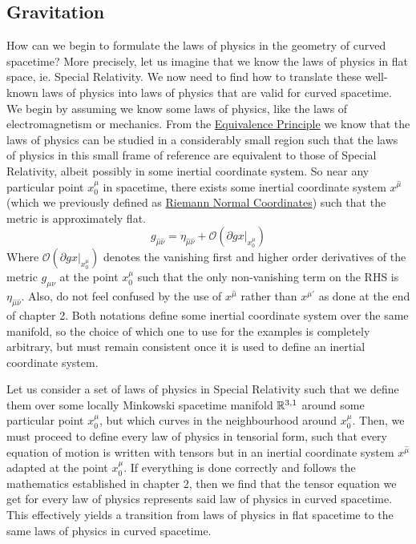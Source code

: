 \documentclass{article}
\begin{document}
 	\subsection{Gravitation}
 		How can we begin to formulate the laws of physics in the geometry of curved spacetime? More precisely, let us imagine that we know the laws of physics in flat space, ie. Special Relativity. We now need to find how to translate these well-known laws of physics into laws of physics that are valid for curved spacetime. We begin by assuming we know some laws of physics, like the laws of electromagnetism or mechanics. From the \hyperref[defn:StrongEquivalence]{Equivalence Principle} we know that the laws of physics can be studied in a considerably small region such that the laws of physics in this small frame of reference are equivalent to those of Special Relativity, albeit possibly in some inertial coordinate system. So near any particular point $x^\mu_0$ in spacetime, there exists some inertial coordinate system $x^{\hat\mu}$(which we previously defined as \hyperref[defn:RNC]{Riemann Normal Coordinates}) such that the metric is approximately flat.
 		$$ g_{\hat\mu\hat\nu} = \eta_{\hat\mu\hat\nu} + \mathcal{O}\left( \partial g \left. x \right|_{x^{\mu}_0}  \right)$$
 		Where $\mathcal{O}\left( \partial g \left. x\right|_{x^\mu_0} \right)$ denotes the vanishing first and higher order derivatives of the metric $g_{\mu\nu}$ at the point $x^\mu_0$ such that the only non-vanishing term on the RHS is $\eta_{\hat\mu\hat\nu}$. Also, do not feel confused by the use of $x^{\hat\mu}$ rather than $x^{\mu'}$ as done at the end of chapter 2. Both notations define some inertial coordinate system over the same manifold, so the choice of which one to use for the examples is completely arbitrary, but must remain consistent once it is used to define an inertial coordinate system.
 		
 		Let us consider a set of laws of physics in Special Relativity such that we define them over some locally Minkowski spacetime manifold $\mathbb{R}^{3,1}$ around some particular point $x^\mu_0$, but which curves in the neighbourhood around $x^{\mu}_0$. Then, we must proceed to define every law of physics in tensorial form, such that every equation of motion is written with tensors but in an inertial coordinate system $x^{\hat\mu}$ adapted at the point $x^\mu_0$. If everything is done correctly and follows the mathematics established in chapter 2, then we find that the tensor equation we get for every law of physics represents said law of physics in curved spacetime. This effectively yields a transition from laws of physics in flat spacetime to the same laws of physics in curved spacetime. 
 		
\end{document}
